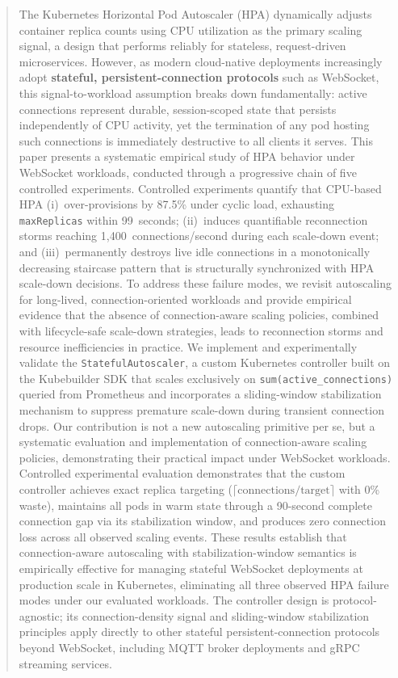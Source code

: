 \documentclass[twocolumn]{svjour3}
\begin{document}
\begin{abstract}
The Kubernetes Horizontal Pod Autoscaler (HPA) dynamically adjusts container replica counts using CPU utilization as the primary scaling signal, a design that performs reliably for stateless, request-driven microservices. However, as modern cloud-native deployments increasingly adopt \textbf{stateful, persistent-connection protocols} such as WebSocket, this signal-to-workload assumption breaks down fundamentally: active connections represent durable, session-scoped state that persists independently of CPU activity, yet the termination of any pod hosting such connections is immediately destructive to all clients it serves. This paper presents a systematic empirical study of HPA behavior under WebSocket workloads, conducted through a progressive chain of five controlled experiments. Controlled experiments quantify that CPU-based HPA (i)~over-provisions by 87.5\% under cyclic load, exhausting \texttt{maxReplicas} within 99~seconds; (ii)~induces quantifiable reconnection storms reaching 1,400~connections/second during each scale-down event; and (iii)~permanently destroys live idle connections in a monotonically decreasing staircase pattern that is structurally synchronized with HPA scale-down decisions. To address these failure modes, we revisit autoscaling for long-lived, connection-oriented workloads and provide empirical evidence that the absence of connection-aware scaling policies, combined with lifecycle-safe scale-down strategies, leads to reconnection storms and resource inefficiencies in practice. We implement and experimentally validate the \texttt{StatefulAutoscaler}, a custom Kubernetes controller built on the Kubebuilder SDK that scales exclusively on \texttt{sum(active\_connections)} queried from Prometheus and incorporates a sliding-window stabilization mechanism to suppress premature scale-down during transient connection drops. Our contribution is not a new autoscaling primitive per se, but a systematic evaluation and implementation of connection-aware scaling policies, demonstrating their practical impact under WebSocket workloads. Controlled experimental evaluation demonstrates that the custom controller achieves exact replica targeting ($\lceil\text{connections}/\text{target}\rceil$ with 0\% waste), maintains all pods in warm state through a 90-second complete connection gap via its stabilization window, and produces zero connection loss across all observed scaling events. These results establish that connection-aware autoscaling with stabilization-window semantics is empirically effective for managing stateful WebSocket deployments at production scale in Kubernetes, eliminating all three observed HPA failure modes under our evaluated workloads. The controller design is protocol-agnostic; its connection-density signal and sliding-window stabilization principles apply directly to other stateful persistent-connection protocols beyond WebSocket, including MQTT broker deployments and gRPC streaming services.

\end{abstract}
\end{document}
